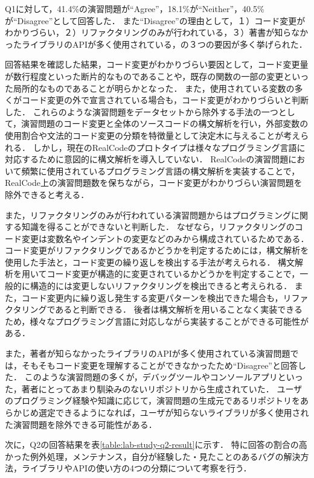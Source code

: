 Q1に対して，41.4\%の演習問題が``Agree''，18.1\%が``Neither''，40.5\%が``Disagree''として回答した．
また``Disagree''の理由として，１）コード変更がわかりづらい，２）リファクタリングのみが行われている，３）著書が知らなかったライブラリのAPIが多く使用されている，の３つの要因が多く挙げられた．

回答結果を確認した結果，コード変更がわかりづらい要因として，コード変更量が数行程度といった断片的なものであることや，既存の関数の一部の変更といった局所的なものであることが明らかとなった．
また，使用されている変数の多くがコード変更の外で宣言されている場合も，コード変更がわかりづらいと判断した．
これらのような演習問題をデータセットから除外する手法の一つとして，演習問題のコード変更と全体のソースコードの構文解析を行い，外部変数の使用割合や文法的コード変更の分類を特徴量として決定木に与えることが考えられる．
しかし，現在のRealCodeのプロトタイプは様々なプログラミング言語に対応するために意図的に構文解析を導入していない．
RealCodeの演習問題において頻繁に使用されているプログラミング言語の構文解析を実装することで，RealCode上の演習問題数を保ちながら，コード変更がわかりづらい演習問題を除外できると考える．

また，リファクタリングのみが行われている演習問題からはプログラミングに関する知識を得ることができないと判断した．
なぜなら，リファクタリングのコード変更は変数名やインデントの変更などのみから構成されているためである．
コード変更がリファクタリングであるかどうかを判定するためには，構文解析を使用した手法と，コード変更の繰り返しを検出する手法が考えられる．
構文解析を用いてコード変更が構造的に変更されているかどうかを判定することで，一般的に構造的には変更しないリファクタリングを検出できると考えられる．
また，コード変更内に繰り返し発生する変更パターンを検出できた場合も，リファクタリングであると判断できる．
後者は構文解析を用いることなく実装できるため，様々なプログラミング言語に対応しながら実装することができる可能性がある．

また，著者が知らなかったライブラリのAPIが多く使用されている演習問題では，そもそもコード変更を理解することができなかったため``Disagree''と回答した．
このような演習問題の多くが，デバッグツールやコンソールアプリといった，著者にとってあまり馴染みのないリポジトリから生成されていた．
ユーザのプログラミング経験や知識に応じて，演習問題の生成元であるリポジトリをあらかじめ選定できるようになれば，ユーザが知らないライブラリが多く使用された演習問題を除外できる可能性がある．

次に，Q2の回答結果を表\ref{table:lab-study-q2-result}に示す．
特に回答の割合の高かった例外処理，メンテナンス，自分が経験した・見たことのあるバグの解決方法，ライブラリやAPIの使い方の4つの分類について考察を行う．



